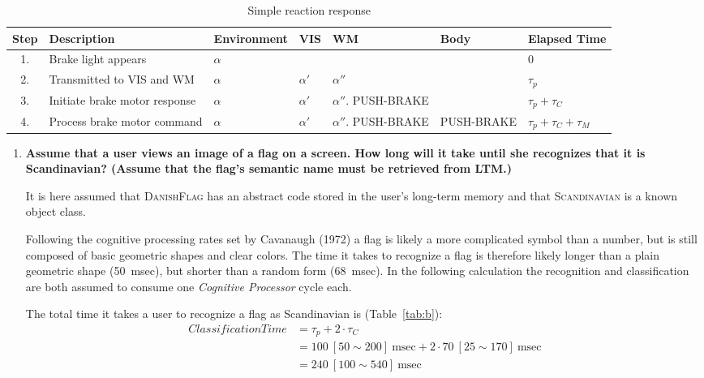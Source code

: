 \begin{table}
{\footnotesize\centering
\begin{tabular}{cllllll}
\toprule
Step & Description                    & Environment & VIS       & WM                              & Body                & Elapsed Time               \\
\midrule
1.   & Brake light appears            & $\alpha$    &           &                                 &                     & 0                          \\
2.   & Transmitted to \ac{VIS} and WM & $\alpha$    & $\alpha'$ & $\alpha''$                      &                     & $\tau_p$                   \\
3.   & Initiate brake motor response  & $\alpha$    & $\alpha'$ & $\alpha''$. \textsc{PUSH-BRAKE} &                     & $\tau_p + \tau_C$          \\
4.   & Process brake motor command    & $\alpha$    & $\alpha'$ & $\alpha''$. \textsc{PUSH-BRAKE} & \textsc{PUSH-BRAKE} & $\tau_p + \tau_C + \tau_M$ \\
\bottomrule
\end{tabular}
}
\caption{Simple reaction response}
\label{tab:a}
\end{table}

\begin{enumerate}[resume*]
\item \textbf{Assume that a user views an image of a flag on a screen. How long will it take until she recognizes that it is Scandinavian? (Assume that the flag's semantic name must be retrieved from \ac{LTM}.)}

It is here assumed that \textsc{DanishFlag} has an abstract code stored in the user's long-term memory and that \textsc{Scandinavian} is a known object class.

Following the cognitive processing rates set by Cavanaugh (1972) a flag is likely a more complicated symbol than a number, but is still composed of basic geometric shapes and clear colors. The time it takes to recognize a flag is therefore likely longer than a plain geometric shape (50~msec), but shorter than a random form (68~msec). In the following calculation the recognition and classification are both assumed to consume one \textit{Cognitive Processor} cycle each.

The total time it takes a user to recognize a flag as Scandinavian is (Table~\ref{tab:b}):
\begin{align*}
\textit{ClassificationTime}
&= \tau_p + 2 \cdot \tau_C \\
&= 100~[50 \sim 200]~\text{msec} + 2 \cdot 70~[25 \sim 170]~\text{msec} \\
&= 240~[100 \sim 540]~\text{msec}
\end{align*}

\end{enumerate}

